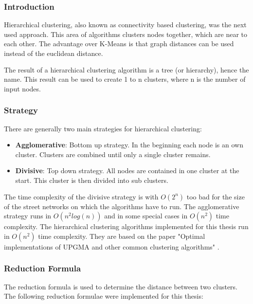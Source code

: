 \documentclass[11pt, a4paper]{report}
\begin{document}
\subsubsection{Introduction}
Hierarchical clustering, also known as connectivity based clustering, was the next used approach. This area of algorithms clusters nodes together, which are near to each other. The advantage over K-Means is that graph distances can be used instead of the euclidean distance.

The result of a hierarchical clustering algorithm is a tree (or hierarchy), hence the name. This result can be used to create 1 to n clusters, where n is the number of input nodes.

\subsubsection{Strategy}
There are generally two main strategies for hierarchical clustering:

\begin{itemize}
    \item \textbf{Agglomerative}: Bottom up strategy. In the beginning each node is an own cluster. Clusters are combined until only a single cluster remains.
    \item \textbf{Divisive}: Top down strategy. All nodes are contained in one cluster at the start. This cluster is then divided into sub clusters.
\end{itemize}

The time complexity of the divisive strategy is with $O(2^n)$ too bad for the size of the street networks on which the algorithms have to run. The agglomerative strategy runs in $O(n^2 log(n))$ and in some special cases in $O(n^2)$ time complexity. The hierarchical clustering algorithms implemented for this thesis run in $O(n^2)$ time complexity. They are based on the paper "Optimal implementations of UPGMA and other common clustering algorithms" \cite{clustering:2007}.

\subsubsection{Reduction Formula}
The reduction formula is used to determine the distance between two clusters.
The following reduction formulae were implemented for this thesis:
\end{document}
